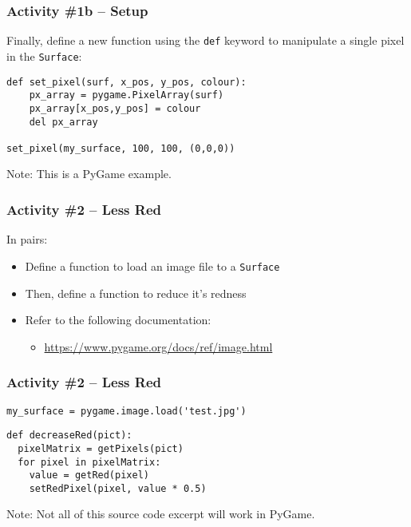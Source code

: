 \begin{frame}[fragile]
	\frametitle{Activity \#1b -- Setup}

Finally, define a new function using the \texttt{def} keyword to manipulate a single pixel in the \texttt{Surface}:
	
\begin{lstlisting}
def set_pixel(surf, x_pos, y_pos, colour):
    px_array = pygame.PixelArray(surf)
    px_array[x_pos,y_pos] = colour
    del px_array

set_pixel(my_surface, 100, 100, (0,0,0))
\end{lstlisting}

Note: This is a PyGame example.

\end{frame}

\begin{frame}
	\frametitle{Activity \#2 -- Less Red}
	
	In pairs:
	
	\vspace{2em}
	
	\begin{itemize}		
		\item Define a function to load an image file to a \texttt{Surface}
		\item Then, define a function to reduce it's redness
		\item Refer to the following documentation:
		\begin{itemize}
			\item \url{https://www.pygame.org/docs/ref/image.html}
		\end{itemize}
	\end{itemize}
\end{frame}

\begin{frame}[fragile]
	\frametitle{Activity \#2 -- Less Red}

\begin{lstlisting}
my_surface = pygame.image.load('test.jpg')
\end{lstlisting}

\vspace{0.5em}

	
\begin{lstlisting}
def decreaseRed(pict):
  pixelMatrix = getPixels(pict)
  for pixel in pixelMatrix:
    value = getRed(pixel)
    setRedPixel(pixel, value * 0.5)
\end{lstlisting}

Note: Not all of this source code excerpt will work in PyGame.

\end{frame}

